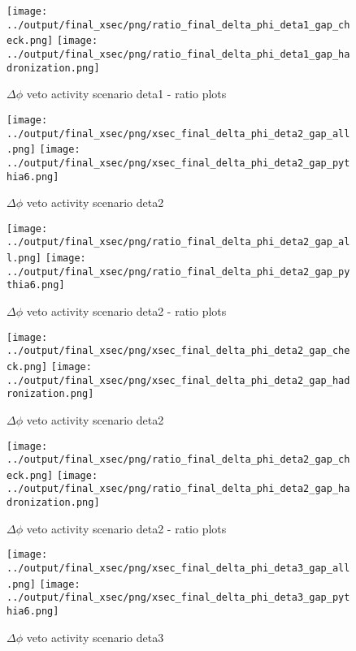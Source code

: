 \documentclass[11pt]{article}
\begin{document}
\begin{figure}[ht]
\centering
\texttt{[image: ../output/final\_xsec/png/ratio\_final\_delta\_phi\_deta1\_gap\_check.png]}
\texttt{[image: ../output/final\_xsec/png/ratio\_final\_delta\_phi\_deta1\_gap\_hadronization.png]}
\caption{$\Delta\phi$ veto activity scenario deta1 - ratio plots}
\label{fig:delta_phi_gap_deta1b_ratio}
\end{figure}


\begin{figure}[ht]
\centering
\texttt{[image: ../output/final\_xsec/png/xsec\_final\_delta\_phi\_deta2\_gap\_all.png]}
\texttt{[image: ../output/final\_xsec/png/xsec\_final\_delta\_phi\_deta2\_gap\_pythia6.png]}
\caption{$\Delta\phi$ veto activity scenario deta2}
\label{fig:delta_phi_gap_deta2}
\end{figure}

\begin{figure}[ht]
\centering
\texttt{[image: ../output/final\_xsec/png/ratio\_final\_delta\_phi\_deta2\_gap\_all.png]}
\texttt{[image: ../output/final\_xsec/png/ratio\_final\_delta\_phi\_deta2\_gap\_pythia6.png]}
\caption{$\Delta\phi$ veto activity scenario deta2 - ratio plots}
\label{fig:delta_phi_gap_deta2_ratio}
\end{figure}

\begin{figure}[ht]
\centering
\texttt{[image: ../output/final\_xsec/png/xsec\_final\_delta\_phi\_deta2\_gap\_check.png]}
\texttt{[image: ../output/final\_xsec/png/xsec\_final\_delta\_phi\_deta2\_gap\_hadronization.png]}
\caption{$\Delta\phi$ veto activity scenario deta2}
\label{fig:delta_phi_gap_deta2b}
\end{figure}

\begin{figure}[ht]
\centering
\texttt{[image: ../output/final\_xsec/png/ratio\_final\_delta\_phi\_deta2\_gap\_check.png]}
\texttt{[image: ../output/final\_xsec/png/ratio\_final\_delta\_phi\_deta2\_gap\_hadronization.png]}
\caption{$\Delta\phi$ veto activity scenario deta2 - ratio plots}
\label{fig:delta_phi_gap_deta2b_ratio}
\end{figure}

\begin{figure}[ht]
\centering
\texttt{[image: ../output/final\_xsec/png/xsec\_final\_delta\_phi\_deta3\_gap\_all.png]}
\texttt{[image: ../output/final\_xsec/png/xsec\_final\_delta\_phi\_deta3\_gap\_pythia6.png]}
\caption{$\Delta\phi$ veto activity scenario deta3}
\label{fig:delta_phi_gap_deta3}
\end{figure}
\end{document}
